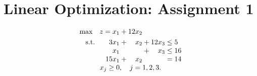 \documentclass[a4paper,10pt]{article}
\theoremstyle{definition}
\begin{document}
\section*{Linear Optimization: Assignment 1}
\begin{align*}
  \begin{array}{r@{}r@{}r@{}l}
    \text{max} \quad z=x_1 &{} + 12x_2 \\[\jot]
    \text{s.t.}\qquad 3x_1 &{} + \phantom{12}x_2 &{} + 12x_3 &{} \leq 5 \\                          x_1 &         &{} +   \phantom{12}x_3 &{} \leq 16 \\                        15x_1 &{} + \phantom{12}x_2 &           &{} = 14 \\         
 \multicolumn{4}{c}{x_j \geq 0, \quad j=1,2,3.}
  \end{array}
\end{align*}
\end{document}
